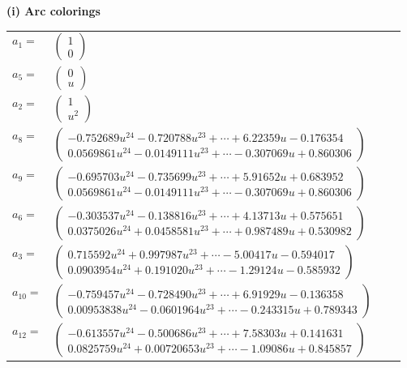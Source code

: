 \documentclass[1p]{elsarticle_modified}
\theoremstyle{definition}
\begin{document}
\flushleft \textbf{(i) Arc colorings}\\
\begin{tabular}{m{7pt} m{180pt} m{7pt} m{180pt} }
\flushright $a_{1}=$&$\begin{pmatrix}1\\0\end{pmatrix}$ \\
\flushright $a_{5}=$&$\begin{pmatrix}0\\u\end{pmatrix}$ \\
\flushright $a_{2}=$&$\begin{pmatrix}1\\u^2\end{pmatrix}$ \\
\flushright $a_{8}=$&$\begin{pmatrix}-0.752689 u^{24}-0.720788 u^{23}+\cdots+6.22359 u-0.176354\\0.0569861 u^{24}-0.0149111 u^{23}+\cdots-0.307069 u+0.860306\end{pmatrix}$ \\
\flushright $a_{9}=$&$\begin{pmatrix}-0.695703 u^{24}-0.735699 u^{23}+\cdots+5.91652 u+0.683952\\0.0569861 u^{24}-0.0149111 u^{23}+\cdots-0.307069 u+0.860306\end{pmatrix}$ \\
\flushright $a_{6}=$&$\begin{pmatrix}-0.303537 u^{24}-0.138816 u^{23}+\cdots+4.13713 u+0.575651\\0.0375026 u^{24}+0.0458581 u^{23}+\cdots+0.987489 u+0.530982\end{pmatrix}$ \\
\flushright $a_{3}=$&$\begin{pmatrix}0.715592 u^{24}+0.997987 u^{23}+\cdots-5.00417 u-0.594017\\0.0903954 u^{24}+0.191020 u^{23}+\cdots-1.29124 u-0.585932\end{pmatrix}$ \\
\flushright $a_{10}=$&$\begin{pmatrix}-0.759457 u^{24}-0.728490 u^{23}+\cdots+6.91929 u-0.136358\\0.00953838 u^{24}-0.0601964 u^{23}+\cdots-0.243315 u+0.789343\end{pmatrix}$ \\
\flushright $a_{12}=$&$\begin{pmatrix}-0.613557 u^{24}-0.500686 u^{23}+\cdots+7.58303 u+0.141631\\0.0825759 u^{24}+0.00720653 u^{23}+\cdots-1.09086 u+0.845857\end{pmatrix}$ \\

\end{tabular}
\end{document}
